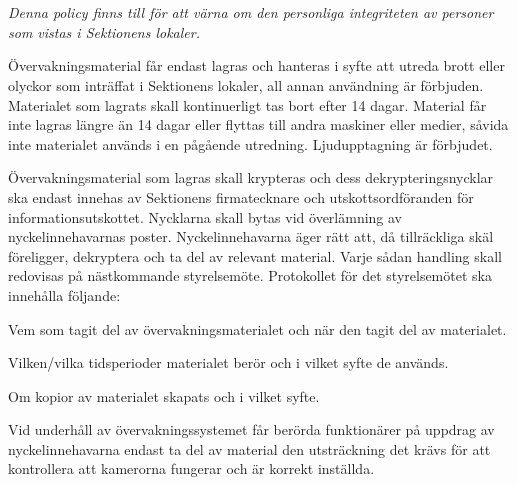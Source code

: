 \documentclass[10pt]{article}
\begin{document}
\section*{\doctitle}
\emph{Denna policy finns till för att värna om den personliga integriteten av personer som vistas i Sektionens lokaler.}

Övervakningsmaterial får endast lagras och hanteras i syfte att utreda brott eller olyckor som inträffat i Sektionens lokaler, all annan användning är förbjuden. Materialet som lagrats skall kontinuerligt tas bort efter 14 dagar. Material får inte lagras längre än 14 dagar eller flyttas till andra maskiner eller medier, såvida inte materialet används i en pågående utredning. Ljudupptagning är förbjudet.

Övervakningsmaterial som lagras skall krypteras och dess dekrypteringsnycklar ska endast innehas av Sektionens firmatecknare och utskottsordföranden för informationsutskottet. Nycklarna skall bytas vid överlämning av nyckelinnehavarnas poster. Nyckelinnehavarna äger rätt att, då tillräckliga skäl föreligger, dekryptera och ta del av relevant material. Varje sådan handling skall redovisas på nästkommande styrelsemöte. Protokollet för det styrelsemötet ska innehålla följande:
\begin{dashlist}
    \item Vem som tagit del av övervakningsmaterialet och när den tagit del av materialet.
    \item Vilken/vilka tidsperioder materialet berör och i vilket syfte de används.
    \item Om kopior av materialet skapats och i vilket syfte.
\end{dashlist}

Vid underhåll av övervakningssystemet får berörda funktionärer på uppdrag av nyckelinnehavarna endast ta del av material den utsträckning det krävs för att kontrollera att kamerorna fungerar och är korrekt inställda.
\end{document}
